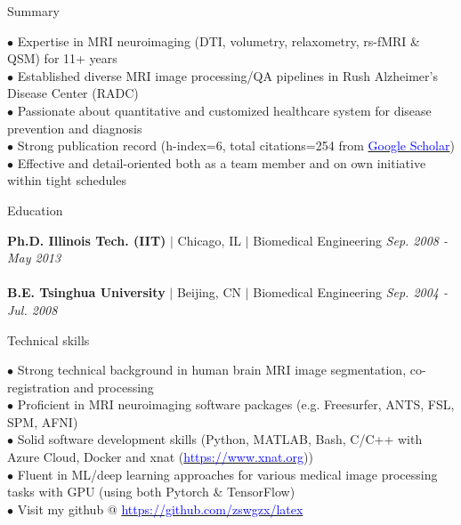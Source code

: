 \documentclass{resume} %
\begin{document}
\begin{rSection}{Summary}

$\bullet$ Expertise in MRI neuroimaging (DTI, volumetry, relaxometry, rs-fMRI \& QSM) for 11+ years\\
$\bullet$ Established diverse MRI image processing/QA pipelines in Rush Alzheimer's Disease Center (RADC)\\
$\bullet$ Passionate about quantitative  and customized healthcare system for disease prevention and diagnosis\\
$\bullet$ Strong publication record (h-index=6, total citations=254 from \href{https://scholar.google.com/citations?user=ZbyXdH4AAAAJ}{\textcolor{blue} {Google Scholar}})\\
$\bullet$ Effective and detail-oriented both as a team member and on own initiative within tight schedules


\end{rSection}


\begin{rSection}{Education}

{\bf Ph.D. \qquad  Illinois Tech. (IIT)} $\vert$ Chicago, IL $\vert$  Biomedical Engineering \hfill {\em Sep. 2008 - May 2013} 
\\ 
\\{\bf B.E. \qquad  Tsinghua University} $\vert$ Beijing, CN  $\vert$ Biomedical Engineering \hfill {\em Sep. 2004 - Jul. 2008} 
\\ 

\end{rSection}

\begin{rSection}{Technical skills}

$\bullet$ Strong technical background in human brain MRI image segmentation, co-registration and processing\\
$\bullet$ Proficient in MRI neuroimaging software packages (e.g. Freesurfer, ANTS, FSL, SPM, AFNI)\\
	$\bullet$ Solid software development skills (Python, MATLAB, Bash, C/C++ with Azure Cloud, Docker and xnat (\href{https://www.xnat.org}{\textcolor{blue}{https://www.xnat.org}}))\\
$\bullet$ Fluent in ML/deep learning approaches for various medical image processing tasks with GPU (using both Pytorch \& TensorFlow)\\
$\bullet$ Visit my github @ \href{https://github.com/zswgzx/latex}{\textcolor{blue}{https://github.com/zswgzx/latex}}
\end{rSection}
\end{document}
